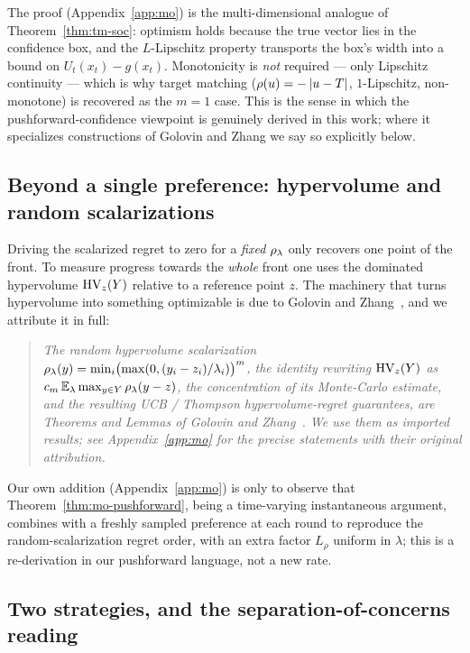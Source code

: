 The proof (Appendix~\ref{app:mo}) is the multi-dimensional analogue of
Theorem~\ref{thm:tm-soc}: optimism holds because the true vector lies in the
confidence box, and the $L$-Lipschitz property transports the box's width into a
bound on $U_t(x_t)-g(x_t)$. Monotonicity is \emph{not} required --- only Lipschitz
continuity --- which is why target matching ($\rho(u)=-\left\lvert u-T\right\rvert$, $1$-Lipschitz,
non-monotone) is recovered as the $m=1$ case. This is the sense in which the
pushforward-confidence viewpoint is genuinely derived in this work; where it
specializes constructions of Golovin and Zhang we say so explicitly below.

\subsection{Beyond a single preference: hypervolume and random scalarizations}
\label{sec:contrib-mo-hv}

Driving the scalarized regret to zero for a \emph{fixed} $\rho_\lambda$ only
recovers one point of the front. To measure progress towards the \emph{whole}
front one uses the dominated hypervolume $\operatorname{HV}_z(Y)$ relative to a reference point
$z$. The machinery that turns hypervolume into something optimizable is due to
Golovin and Zhang~\cite{golovin2020}, and we attribute it in full:

\begin{quote}
\itshape The random hypervolume scalarization
$\rho_\lambda(y)=\min_i\bigl(\max(0,(y_i-z_i)/\lambda_i)\bigr)^m$, the identity
rewriting $\operatorname{HV}_z(Y)$ as $c_m\,\mathbb{E}_{\lambda}\max_{y\in Y}\rho_\lambda(y-z)$, the
concentration of its Monte-Carlo estimate, and the resulting UCB / Thompson
hypervolume-regret guarantees, are Theorems and Lemmas of
Golovin and Zhang~\cite{golovin2020}. We use them as imported results; see
Appendix~\ref{app:mo} for the precise statements with their original attribution.
\end{quote}

Our own addition (Appendix~\ref{app:mo}) is only to observe that
Theorem~\ref{thm:mo-pushforward}, being a time-varying instantaneous argument,
combines with a freshly sampled preference at each round to reproduce the
random-scalarization regret order, with an extra factor $L_\rho$ uniform in
$\lambda$; this is a re-derivation in our pushforward language, not a new rate.
\hfill\Psynth

\subsection{Two strategies, and the separation-of-concerns reading}
\label{sec:contrib-mo-sharing}

